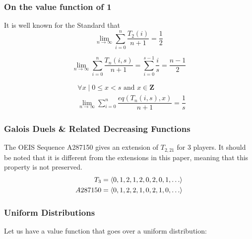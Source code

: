 \documentclass[conference]{IEEEtran}
\begin{document}
\subsubsection{On the value function of 1}

It is well known \cite{Cai_2020} for the Standard \TMS that
\begin{equation}
    \lim_{n\to\infty} \sum_{i=0}^n \dfrac{T_{2}(i)}{n+1} = \dfrac{1}{2}
\end{equation}


\begin{equation}
    \lim_{n\to\infty} \sum_{i=0}^n\dfrac{T_{n}(i, s)}{n+1} = \sum_{i=0}^{s-1}\dfrac{i}{s} = \dfrac{n-1}{2}
\end{equation}


\begin{equation}
\begin{aligned}
    &\forall{x} \;|\; 0 \le x < s \text{ and } x \in \mathbf{Z} \\
    &\lim_{n\to\infty} \sum_{i=0}^n\dfrac{eq\left(T_{n}(i, s), x\right)}{n+1} = \dfrac{1}{s}
\end{aligned}
\end{equation}

\subsubsection{Galois Duels \& Related Decreasing Functions}

The OEIS Sequence A287150 \cite{cooper_2011, OEIS-A287150} gives an extension of $T_{2,21}$ for 3 players. It should be noted that it is different from the extensions in this paper, meaning that this property is not preserved. \begin{equation}
\begin{aligned}
    T_3 &= \tuple{0, 1, 2, 1, 2, 0, 2, 0, 1, \dots} \\
A287150 &= \tuple{0, 1, 2, 2, 1, 0, 2, 1, 0, \dots}
\end{aligned}
\end{equation}

\subsubsection{Uniform Distributions}

Let us have a value function that goes over a uniform distribution:
\end{document}
